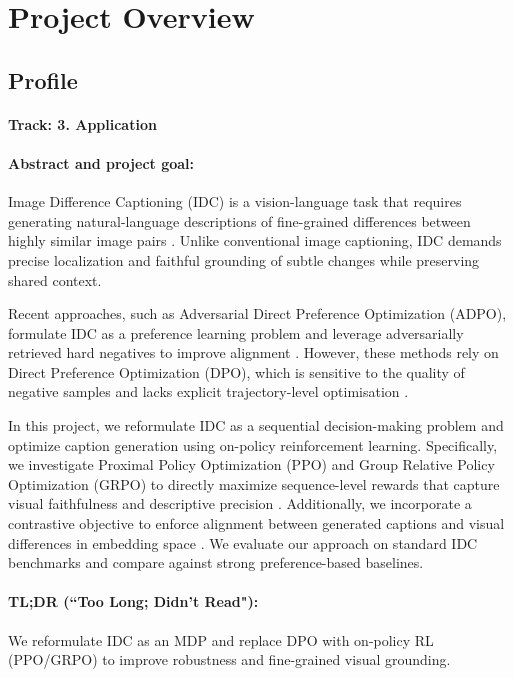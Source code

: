 \documentclass{article}
\begin{document}
\section{Project Overview}
\label{section:intro}

\subsection{Profile}

\paragraph{Track: 3. Application}

\paragraph{Abstract and project goal:}
Image Difference Captioning (IDC) is a vision-language task that requires generating natural-language descriptions of fine-grained differences between highly similar image pairs \citep{jhamtani2018learning}. Unlike conventional image captioning, IDC demands precise localization and faithful grounding of subtle changes while preserving shared context.

Recent approaches, such as Adversarial Direct Preference Optimization (ADPO), formulate IDC as a preference learning problem and leverage adversarially retrieved hard negatives to improve alignment \citep{huang-etal-2025-image}. However, these methods rely on Direct Preference Optimization (DPO), which is sensitive to the quality of negative samples and lacks explicit trajectory-level optimisation \citep{rafailov2023direct}.

In this project, we reformulate IDC as a sequential decision-making problem and optimize caption generation using on-policy reinforcement learning. Specifically, we investigate Proximal Policy Optimization (PPO) and Group Relative Policy Optimization (GRPO) to directly maximize sequence-level rewards that capture visual faithfulness and descriptive precision \citep{shao2024deepseekmath}. Additionally, we incorporate a contrastive objective to enforce alignment between generated captions and visual differences in embedding space \citep{radford2021learning}. We evaluate our approach on standard IDC benchmarks and compare against strong preference-based baselines.

\paragraph{TL;DR (``Too Long; Didn't Read"):}
We reformulate IDC as an MDP and replace DPO with on-policy RL (PPO/GRPO) to improve robustness and fine-grained visual grounding.
\end{document}
